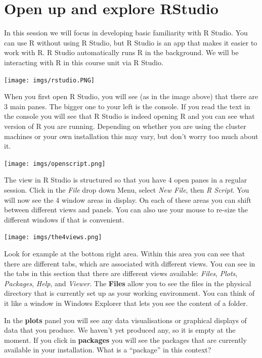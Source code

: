 \documentclass[
]{book}
\begin{document}
\hypertarget{open-up-and-explore-rstudio}{%
\section{Open up and explore RStudio}\label{open-up-and-explore-rstudio}}

In this session we will focus in developing basic familiarity with R Studio. You can use R without using R Studio, but R Studio is an app that makes it easier to work with R. R Studio automatically runs R in the background. We will be interacting with R in this course unit via R Studio.

\texttt{[image: imgs/rstudio.PNG]}

When you first open R Studio, you will see (as in the image above) that there are 3 main panes. The bigger one to your left is the console. If you read the text in the console you will see that R Studio is indeed opening R and you can see what version of R you are running. Depending on whether you are using the cluster machines or your own installation this may vary, but don't worry too much about it.

\texttt{[image: imgs/openscript.png]}

The view in R Studio is structured so that you have 4 open panes in a regular session. Click in the \emph{File} drop down Menu, select \emph{New File}, then \emph{R Script}. You will now see the 4 window areas in display. On each of these areas you can shift between different views and panels. You can also use your mouse to re-size the different windows if that is convenient.

\texttt{[image: imgs/the4views.png]}

Look for example at the bottom right area. Within this area you can see that there are different tabs, which are associated with different views. You can see in the tabs in this section that there are different views available: \emph{Files}, \emph{Plots}, \emph{Packages}, \emph{Help}, and \emph{Viewer}. The \textbf{Files} allow you to see the files in the physical directory that is currently set up as your working environment. You can think of it like a window in Windows Explorer that lets you see the content of a folder.

In the \textbf{plots} panel you will see any data visualisations or graphical displays of data that you produce. We haven't yet produced any, so it is empty at the moment. If you click in \textbf{packages} you will see the packages that are currently available in your installation. What is a ``package'' in this context?
\end{document}

